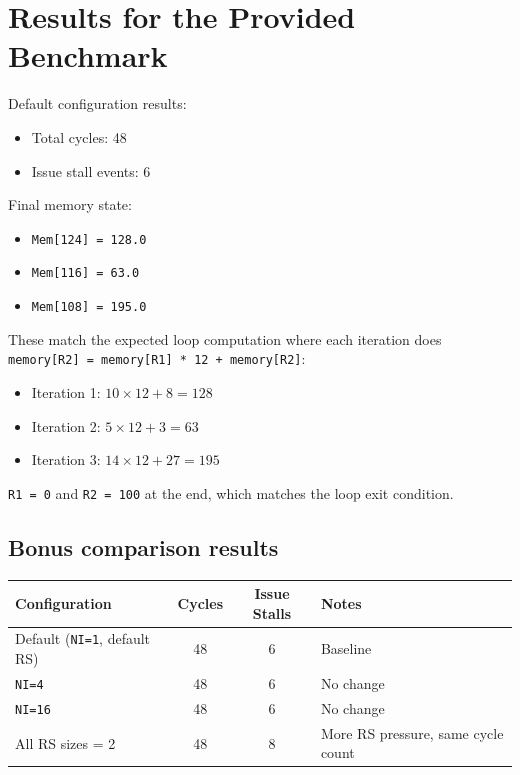 \documentclass[11pt]{article}
\begin{document}
\section{Results for the Provided Benchmark}
Default configuration results:

\begin{itemize}
\item Total cycles: 48
\item Issue stall events: 6
\end{itemize}

Final memory state:

\begin{itemize}
\item \texttt{Mem[124] = 128.0}
\item \texttt{Mem[116] = 63.0}
\item \texttt{Mem[108] = 195.0}
\end{itemize}

These match the expected loop computation where each iteration does \texttt{memory[R2] = memory[R1] * 12 + memory[R2]}:

\begin{itemize}
\item Iteration 1: $10 \times 12 + 8 = 128$
\item Iteration 2: $5 \times 12 + 3 = 63$
\item Iteration 3: $14 \times 12 + 27 = 195$
\end{itemize}

\texttt{R1 = 0} and \texttt{R2 = 100} at the end, which matches the loop exit condition.

\subsection*{Bonus comparison results}
\begin{center}
\begin{tabular}{lccp{2.8in}}
\toprule
Configuration & Cycles & Issue Stalls & Notes \\
\midrule
Default (\texttt{NI=1}, default RS) & 48 & 6 & Baseline \\
\texttt{NI=4} & 48 & 6 & No change \\
\texttt{NI=16} & 48 & 6 & No change \\
All RS sizes = 2 & 48 & 8 & More RS pressure, same cycle count \\
\bottomrule
\end{tabular}
\end{center}
\end{document}

